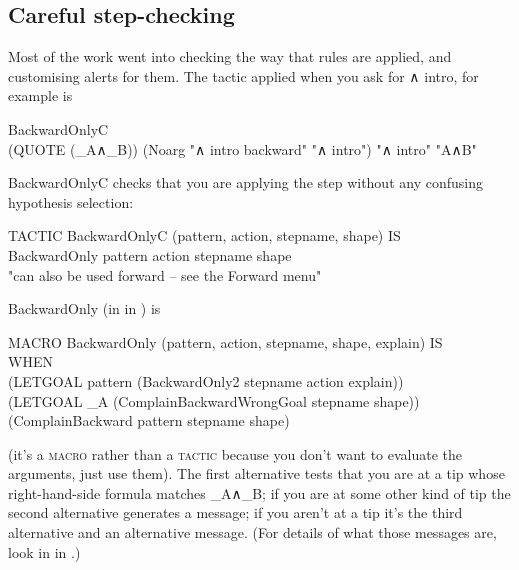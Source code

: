 \subsection{Careful step-checking}

Most of the work went into checking the way that rules are applied, and customising alerts for them. The tactic applied when you ask for ∧ intro, for example is
\begin{japeish}
BackwardOnlyC \\
\tab (QUOTE (\_A∧\_B)) (Noarg "∧ intro backward" "∧ intro") "∧ intro" "A∧B"
\end{japeish}
BackwardOnlyC checks that you are applying the step without any confusing hypothesis selection:
\begin{japeish}
TACTIC BackwardOnlyC (pattern, action, stepname, shape) IS\\
\tab BackwardOnly pattern action stepname shape \\
\tab \tab "can also be used forward -- see the Forward menu"
\end{japeish}
BackwardOnly (in  in ) is
\begin{japeish}
MACRO BackwardOnly (pattern, action, stepname, shape, explain) IS \\
\tab WHEN \\
\tab \tab (LETGOAL pattern (BackwardOnly2 stepname action explain)) \\
\tab \tab (LETGOAL \_A (ComplainBackwardWrongGoal stepname shape)) \\
\tab \tab (ComplainBackward pattern stepname shape)
\end{japeish}
(it's a \textsc{macro} rather than a \textsc{tactic} because you don't want to evaluate the arguments, just use them). The first alternative tests that you are at a tip whose right-hand-side formula matches \_A∧\_B; if you are at some other kind of tip the second alternative generates a message; if you aren't at a tip it's the third alternative and an alternative message. (For details of what those messages are, look in  in .)

